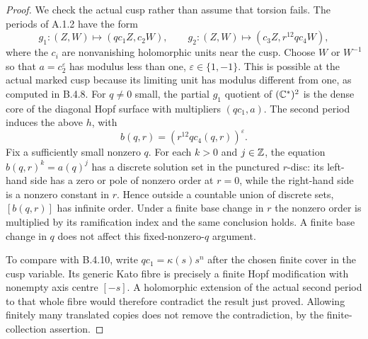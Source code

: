 \begin{proof}
We check the actual cusp rather than assume that torsion fails.
The periods of A.1.2 have the form
\[
 g_1:(Z,W)\longmapsto(q c_1 Z,c_2W),\qquad
 g_2:(Z,W)\longmapsto(c_3Z,r^{12}q c_4 W),
\]
where the $c_i$ are nonvanishing holomorphic units near the cusp.
Choose $W$ or $W^{-1}$ so that
$a=c_2^{\varepsilon}$ has modulus less than one,
$\varepsilon\in\{1,-1\}$.
This is possible at the actual marked cusp because its limiting
unit has modulus different from one, as computed in B.4.8.
For $q\ne0$ small, the partial $g_1$ quotient of $(\mathbb C^*)^2$
is the dense core of the diagonal Hopf surface with multipliers
$(q c_1,a)$. The second period induces the above $h$, with
\[
 b(q,r)=(r^{12}q c_4(q,r))^{\varepsilon}.
\]
Fix a sufficiently small nonzero $q$. For each $k>0$ and
$j\in\mathbb Z$, the equation $b(q,r)^k=a(q)^j$ has a discrete
solution set in the punctured $r$-disc: its left-hand side has
a zero or pole of nonzero order at $r=0$, while the right-hand
side is a nonzero constant in $r$.
Hence outside a countable union of discrete sets, $[b(q,r)]$
has infinite order. Under a finite base change in $r$ the
nonzero order is multiplied by its ramification index and
the same conclusion holds. A finite base change in $q$ does
not affect this fixed-nonzero-$q$ argument.

To compare with B.4.10, write $q c_1=\kappa(s)s^n$ after
the chosen finite cover in the cusp variable. Its generic Kato
fibre is precisely a finite Hopf modification with nonempty
axis centre $[-s]$. A holomorphic extension of the actual second
period to that whole fibre would therefore contradict the result
just proved. Allowing finitely many translated copies does not
remove the contradiction, by the finite-collection assertion.
\end{proof}

